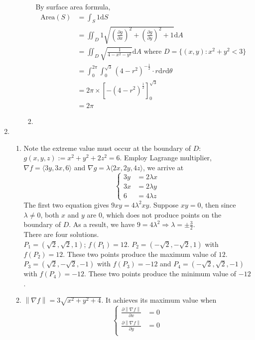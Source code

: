 \documentclass[12pt]{article}
\newcommand{\diff}{\mathrm{d}}
\newcommand\norm[1]{\left\lVert#1\right\rVert}
\theoremstyle{definition}
\begin{document}
\begin{enumerate}
\begin{enumerate}
\begin{enumerate}
    By surface area formula,
    \begin{align*}
    \text{Area}(S)&=\int_S1\diff S\\
    &=\iint_D 1\sqrt{\left(\frac{\partial g}{\partial x}\right)^2+\left(\frac{\partial g}{\partial y}\right)^2+1}\diff A\\
    &=\iint_D \sqrt{\frac{1}{4-x^2-y^2}}\diff A\text{ where }D = \{(x,y): x^2+y^2<3\}\\
    &=\int_0^{2\pi}\int_0^{\sqrt{3}}(4-r^2)^{-\frac{1}{2}}\cdot r\diff r\diff \theta\\
    &=2\pi\times\left[-(4-r^2)^{\frac{1}{2}}\right]_0^{\sqrt{3}}\\
    &=2\pi
    \end{align*}
    \item 
  \end{enumerate}
  \end{enumerate}
  \item \begin{enumerate} %
  \item Note the extreme value must occur at the boundary of $D$: $g(x,y,z):=x^2+y^2+2z^2=6$. Employ Lagrange multiplier, $\nabla f = \langle 3y, 3x, 6\rangle$ and $\nabla g = \lambda\langle 2x, 2y, 4z\rangle$, we arrive at
  \[
\begin{cases}
3y&=2\lambda x\\
3x&=2\lambda y\\
6&=4\lambda z
\end{cases}
  \]
  The first two equation gives $9xy=4\lambda^2xy$. Suppose $xy=0$, then since $\lambda\neq 0$, both $x$ and $y$ are $0$, which does not produce points on the boundary of $D$. As a result, we have $9=4\lambda^2\Rightarrow \lambda = \pm \frac{3}{2}$.\\
  There are four solutions.\\
  $P_1=(\sqrt{2},\sqrt{2},1)$; $f(P_1)=12$. $P_2=(-\sqrt{2},-\sqrt{2},1)$ with $f(P_2)=12$. These two points produce the maximum value of $12$.\\
  $P_3=(\sqrt{2},-\sqrt{2},-1)$ with $f(P_3)=-12$ and $P_4=(-\sqrt{2},\sqrt{2},-1)$ with $f(P_4)=-12$. These two points produce the minimum value of $-12$.
  \item $\norm{\nabla f}=3\sqrt{x^2+y^2+4}$. It achieves its maximum value when
  \[
\begin{cases}
\frac{\partial \norm{\nabla f}}{\partial x} &= 0\\
\frac{\partial \norm{\nabla f}}{\partial y} &= 0\\

\end{cases}\]
\end{enumerate}
\end{enumerate}
\end{document}
